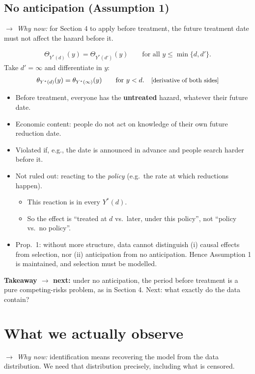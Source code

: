 \documentclass[11pt]{article}
\newcommand{\1}{\mathbf{1}}
\newcommand{\why}[1]{\text{\small[#1]}}
\newcommand{\whynow}[1]{\par\noindent\textit{$\rightarrow$ Why now:} #1\par}
\newcommand{\takeaway}[1]{\par\noindent\textbf{Takeaway $\rightarrow$ next:} #1\par}
\begin{document}
\subsection{No anticipation (Assumption 1)}
\whynow{for Section 4 to apply before treatment, the future treatment date must not affect the hazard before it.}
\begin{align}
  \Theta_{Y^*(d)}(y) = \Theta_{Y^*(d')}(y) \qquad\text{for all } y\le\min\{d,d'\}. \nonumber
\end{align}
Take $d'=\infty$ and differentiate in $y$:
\begin{align}
  \theta_{Y^*(d)}(y) = \theta_{Y^*(\infty)}(y) \qquad\text{for } y<d. && \why{derivative of both sides} \nonumber
\end{align}
\begin{itemize}
  \item Before treatment, everyone has the \textbf{untreated} hazard, whatever their future date.
  \item Economic content: people do not act on knowledge of their own future reduction date.
  \item Violated if, e.g., the date is announced in advance and people search harder before it.
  \item Not ruled out: reacting to the \emph{policy} (e.g.\ the rate at which reductions happen).
    \begin{itemize}
      \item This reaction is in every $Y^*(d)$.
      \item So the effect is ``treated at $d$ vs.\ later, under this policy'', not ``policy vs.\ no policy''.
    \end{itemize}
  \item Prop.~1: without more structure, data cannot distinguish (i) causal effects from selection, nor (ii) anticipation from no anticipation. Hence Assumption 1 is maintained, and selection must be modelled.
\end{itemize}
\takeaway{under no anticipation, the period before treatment is a pure competing-risks problem, as in Section 4. Next: what exactly do the data contain?}

\section{What we actually observe}
\whynow{identification means recovering the model from the data distribution. We need that distribution precisely, including what is censored.}
\end{document}

